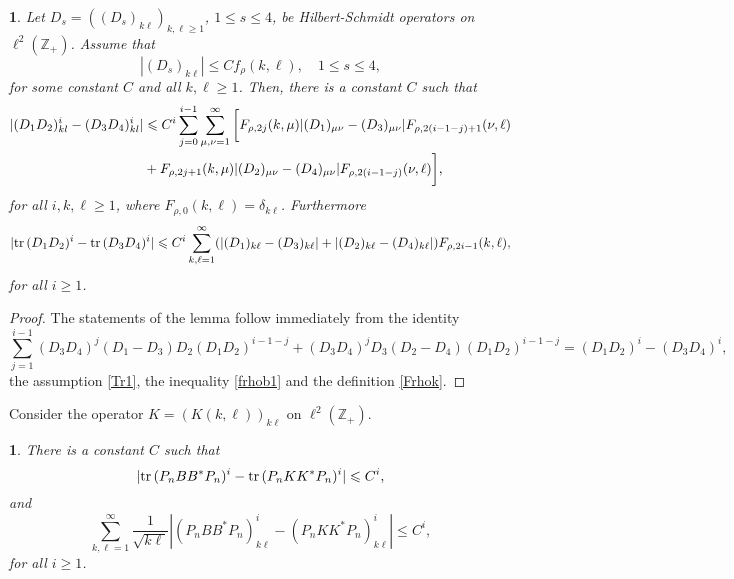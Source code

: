 \documentclass{article}
\numberwithin{equation}{section}
\numberwithin{figure}{section}
\theoremstyle{plain}
\theoremstyle{plain}
\newtheorem{lemma}[thm]{\protect\lemmaname}
\numberwithin{thm}{section}
\theoremstyle{remark}
\providecommand{\lemmaname}{Lemma}
\newcommand{\Tr}{\text{{\rm tr\,}}}
\newcommand{\Z}{\mathbb{Z}}
\let \le \leqslant
\let \ge \geqslant
\begin{document}
\begin{lemma}\label{Lem:Tr}
Let $D_s=((D_s)_{k\ell})_{k,\ell\ge 1}$, $1\le s\le 4$, be Hilbert-Schmidt operators on $\ell^2(\Z_+)$. Assume that
\begin{equation}\label{Tr1}
|(D_s)_{k\ell}|\le Cf_\rho(k,\ell), \quad 1\le s\le 4,
\end{equation}
for some constant $C$ and all $k,\ell\ge 1$. Then, there is a constant $C$ such that
\begin{align}\label{Trkl}
|(D_1D_2)^i_{kl}-(D_3D_4)^i_{kl}|&\le C^i\sum_{j=0}^{i-1}\sum_{\mu,\nu=1}^\infty \bigg[F_{\rho,2j}(k,\mu)|(D_1)_{\mu\nu}-(D_3)_{\mu\nu}|F_{\rho,2(i-1-j)+1}(\nu,\ell)\notag
\\&+F_{\rho,2j+1}(k,\mu)|(D_2)_{\mu\nu}-(D_4)_{\mu\nu}|F_{\rho,2(i-1-j)}(\nu,\ell)\bigg],
\end{align}
for all $i,k,\ell\ge 1$, where $F_{\rho,0}(k,\ell)=\delta_{k\ell}$.
Furthermore
\begin{equation}\label{Tr2}
|\Tr(D_1D_2)^i-\Tr(D_3D_4)^i|\le C^i\sum_{k,\ell=1}^\infty(|(D_1)_{k\ell}-(D_3)_{k\ell}|+|(D_2)_{k\ell}-(D_4)_{k\ell}|)F_{\rho,2i-1}(k,\ell),
\end{equation}
for all $i\ge 1$.
\end{lemma}
\begin{proof}
    The statements of the lemma follow immediately from  the identity
    \begin{equation*}
        \sum_{j=1}^{i-1}(D_3D_4)^j(D_1-D_3)D_2(D_1D_2)^{i-1-j}+
        (D_3D_4)^jD_3(D_2-D_4)(D_1D_2)^{i-1-j}=(D_1D_2)^i-(D_3D_4)^i,
    \end{equation*}
    the assumption \eqref{Tr1}, the inequality \eqref{frhob1} and the definition \eqref{Frhok}.
\end{proof}

Consider the operator $K=(K(k,\ell))_{k\ell}$ on $\ell^2(\Z_+)$.

\begin{lemma}\label{Lem:Trcomp5}
There is a constant $C$ such that
\begin{equation}\label{TrComp5}
|\Tr(P_nBB^*P_n)^i-\Tr(P_nKK^*P_n)^i|\le C^i,
\end{equation}
and
\begin{equation}
    \sum_{k,\ell=1}^\infty\frac 1{\sqrt{k\ell}}|(P_nBB^*P_n)^i_{k\ell}-(P_nKK^*P_n)^i_{k\ell}|\le C^i,
\end{equation}
for all $i\ge 1$.
\end{lemma}
\end{document}
